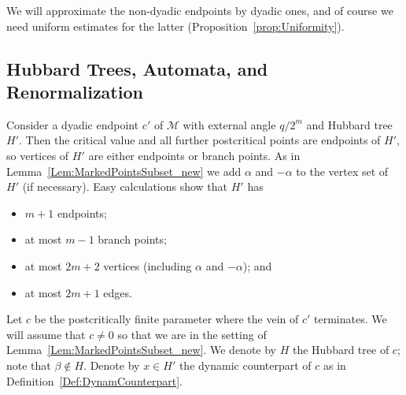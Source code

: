 \documentclass[12pt]{amsart}
\newcommand{\M}{\mathscr M}
\newcommand{\0}{\texttt{0}}
\newcommand{\1}{\texttt{1}}
\theoremstyle{definition}
\numberwithin{equation}{section}
\begin{document}
We will approximate the non-dyadic endpoints by dyadic ones, and of course we need uniform estimates for the latter (Proposition~\ref{prop:Uniformity}).



\subsection{Hubbard Trees, Automata, and Renormalization}
\label{Sub:TreesAutomataRenormalization}
Consider a dyadic endpoint $c'$ of $\M$ with external angle ${q}/{2^m}$ and Hubbard tree $H'$. Then the critical value and all further postcritical points are endpoints of $H'$, so vertices of $H'$ are either endpoints or branch points. As in Lemma~\ref{Lem:MarkedPointsSubset_new} we add $\alpha$ and $-\alpha$ to the vertex set of $ H'$ (if necessary).   Easy calculations show that $H'$ has
\begin{itemize}
\item $m+1$ endpoints;
\item at most $m-1$ branch points; 
\item at most $2m+2$ vertices  (including $\alpha$ and $-\alpha$); and 
\item at most $2m+1$ edges. 
 \end{itemize}  

 Let $c$ be the postcritically finite parameter where the vein of $c'$ terminates.  We will assume that $c\not=0$ so that we are in the setting of Lemma~\ref{Lem:MarkedPointsSubset_new}. We denote by $H$ the Hubbard tree of $c$; note that $\beta \not\in H$. 
Denote by $x\in H'$ the dynamic counterpart of $c$ as in Definition~\ref{Def:DynamCounterpart}. 
\end{document}
